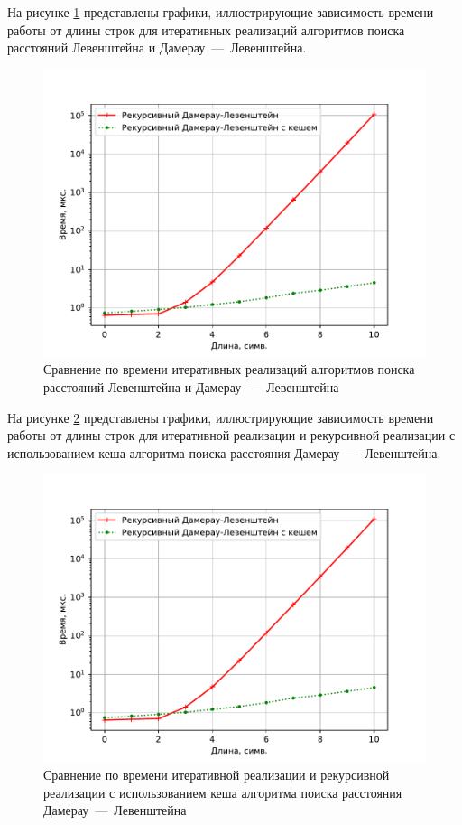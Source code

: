 На рисунке \ref{plt:time_02} представлены графики, иллюстрирующие зависимость времени работы от длины строк для итеративных реализаций алгоритмов поиска расстояний Левенштейна и Дамерау~---~Левенштейна.
\begin{figure}[H]
	\centering
	\includegraphics[height=0.5\textheight, page=2]{img/figures.pdf}
	\caption{Сравнение по времени итеративных реализаций алгоритмов поиска расстояний Левенштейна и Дамерау~---~Левенштейна}
	\label{plt:time_02}
\end{figure}

На рисунке \ref{plt:time_03} представлены графики, иллюстрирующие зависимость времени работы от длины строк для итеративной реализации и рекурсивной реализации с использованием кеша алгоритма поиска расстояния Дамерау~---~Левенштейна. 
\begin{figure}[H]
	\centering
	\includegraphics[height=0.5\textheight, page=3]{img/figures.pdf}
	\caption{Сравнение по времени итеративной реализации и рекурсивной реализации с использованием кеша алгоритма поиска расстояния Дамерау~---~Левенштейна}
	\label{plt:time_03}
\end{figure}

